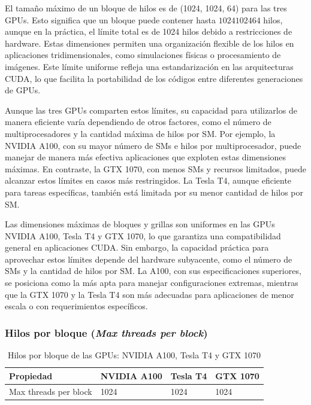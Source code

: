 \documentclass{article}
\begin{document}
			El tamaño máximo de un bloque de hilos es de (1024, 1024, 64) para las tres GPUs. Esto significa que un bloque puede contener hasta
			$1024  1024  64$ hilos, aunque en la práctica, el límite total es de 1024 hilos debido a restricciones de hardware. Estas dimensiones permiten una organización flexible de los hilos en aplicaciones tridimensionales, como simulaciones físicas o procesamiento de imágenes. Este límite uniforme refleja una estandarización en las arquitecturas CUDA, lo que facilita la portabilidad de los códigos entre diferentes generaciones de GPUs.

			Aunque las tres GPUs comparten estos límites, su capacidad para utilizarlos de manera eficiente varía dependiendo de otros factores, como el número de multiprocesadores y la cantidad máxima de hilos por SM. Por ejemplo, la NVIDIA A100, con su mayor número de SMs e hilos por multiprocesador, puede manejar de manera más efectiva aplicaciones que exploten estas dimensiones máximas. En contraste, la GTX 1070, con menos SMs y recursos limitados, puede alcanzar estos límites en casos más restringidos. La Tesla T4, aunque eficiente para tareas específicas, también está limitada por su menor cantidad de hilos por SM.

			Las dimensiones máximas de bloques y grillas son uniformes en las GPUs NVIDIA A100, Tesla T4 y GTX 1070, lo que garantiza una compatibilidad general en aplicaciones CUDA. Sin embargo, la capacidad práctica para aprovechar estos límites depende del hardware subyacente, como el número de SMs y la cantidad de hilos por SM. La A100, con sus especificaciones superiores, se posiciona como la más apta para manejar configuraciones extremas, mientras que la GTX 1070 y la Tesla T4 son más adecuadas para aplicaciones de menor escala o con requerimientos específicos.

		\subsubsection{Hilos por bloque (\textit{Max threads per block})}

			\begin{table}[H]
				\begin{adjustbox}{width=\textwidth, keepaspectratio}
					\begin{tabular}{|l|l|l|l|}
						\hline
						\textbf{Propiedad} & \textbf{NVIDIA A100} & \textbf{Tesla T4} & \textbf{GTX 1070} \\ \hline
						Max threads per block & 1024 & 1024 & 1024 \\ \hline
					\end{tabular}
				\end{adjustbox}
				\centering
				\caption{Hilos por bloque de las GPUs: NVIDIA A100, Tesla T4 y GTX 1070}
			\end{table}
\end{document}
